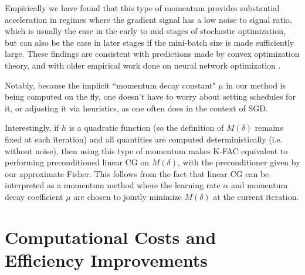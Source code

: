 \documentclass[12pt]{article}
\newcommand{\acronym}{K-FAC}
\begin{document}
Empirically we have found that this type of momentum provides substantial acceleration in regimes where the gradient signal has a low noise to signal ratio, which is usually the case in the early to mid stages of stochastic optimization, but can also be the case in later stages if the mini-batch size is made sufficiently large. %
These findings are consistent with predictions made by convex optimization theory, and with older empirical work done on neural network optimization \citep{lecun_tricks}. 

Notably, because the implicit ``momentum decay constant" $\mu$ in our method is being computed on the fly, one doesn't have to worry about setting schedules for it, or adjusting it via heuristics, as one often does in the context of SGD.

Interestingly, if $h$ is a quadratic function (so the definition of $M(\delta)$ remains fixed at each iteration) and all quantities are computed deterministically (i.e. without noise), then using this type of momentum makes \acronym{} equivalent to performing preconditioned linear CG on $M(\delta)$, with the preconditioner given by our approximate Fisher.  This follows from the fact that linear CG can be interpreted as a momentum method where the learning rate $\alpha$ and momentum decay coefficient $\mu$ are chosen to jointly minimize $M(\delta)$ at the current iteration.



\section{Computational Costs and Efficiency Improvements}
\label{sec:efficiency}
\end{document}
